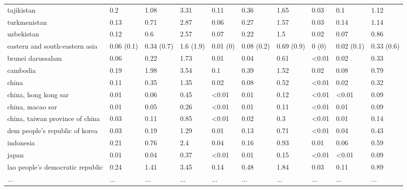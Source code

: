 \begin{table}[!h]
\begin{tabular}[t]{llllllllll}
\addlinespace
tajikistan & 0.2 & 1.08 & 3.31 & 0.11 & 0.36 & 1.65 & 0.03 & 0.1 & 1.12\\
turkmenistan & 0.13 & 0.71 & 2.87 & 0.06 & 0.27 & 1.57 & 0.03 & 0.14 & 1.14\\
uzbekistan & 0.12 & 0.6 & 2.57 & 0.07 & 0.22 & 1.5 & 0.02 & 0.07 & 0.86\\
eastern and south-eastern asia & 0.06 (0.1) & 0.34 (0.7) & 1.6 (1.9) & 0.01 (0) & 0.08 (0.2) & 0.69 (0.9) & 0 (0) & 0.02 (0.1) & 0.33 (0.6)\\
brunei darussalam & 0.06 & 0.22 & 1.73 & 0.01 & 0.04 & 0.61 & <0.01 & 0.02 & 0.33\\
\addlinespace
cambodia & 0.19 & 1.98 & 3.54 & 0.1 & 0.39 & 1.52 & 0.02 & 0.08 & 0.79\\
china & 0.11 & 0.35 & 1.35 & 0.02 & 0.08 & 0.52 & <0.01 & 0.02 & 0.32\\
china, hong kong sar & 0.01 & 0.06 & 0.45 & <0.01 & 0.01 & 0.12 & <0.01 & <0.01 & 0.09\\
china, macao sar & 0.01 & 0.05 & 0.26 & <0.01 & 0.01 & 0.11 & <0.01 & 0.01 & 0.09\\
china, taiwan province of china & 0.03 & 0.11 & 0.85 & <0.01 & 0.02 & 0.3 & <0.01 & 0.01 & 0.14\\
\addlinespace
dem people's republic of korea & 0.03 & 0.19 & 1.29 & 0.01 & 0.13 & 0.71 & <0.01 & 0.04 & 0.43\\
indonesia & 0.21 & 0.76 & 2.4 & 0.04 & 0.16 & 0.93 & 0.01 & 0.06 & 0.59\\
japan & 0.01 & 0.04 & 0.37 & <0.01 & 0.01 & 0.15 & <0.01 & <0.01 & 0.09\\
lao people's democratic republic & 0.24 & 1.41 & 3.45 & 0.14 & 0.48 & 1.84 & 0.03 & 0.11 & 0.89\\
... & ... & ... & ... & ... & ... & ... & ... & ... & ...\\
\bottomrule
\end{tabular}
\end{table}
